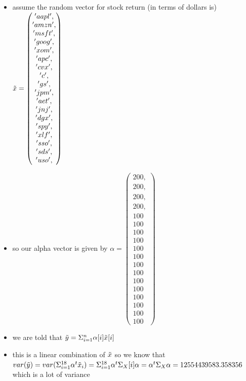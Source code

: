 \documentclass[12pt,twoside]{article}
\begin{document}
\begin{enumerate}
\begin{enumerate}
  \begin{itemize}
    \color{blue}
    \item assume the random vector for stock return (in terms of dollars is) $\Tilde{x}=\begin{pmatrix}
      'aapl',\\
      'amzn',\\
      'msft',\\
      'goog',\\
      'xom', \\
      'apc',  \\
      'cvx', \\
      'c',    \\
      'gs',  \\
      'jpm', \\
      'aet', \\
      'jnj',  \\
      'dgx',\\
      'spy',  \\
      'xlf',\\
      'sso',  \\
      'sds',  \\
      'uso', \\
    \end{pmatrix}$ 
    \item so our alpha vector is given by $\alpha=\begin{pmatrix}
      200,\\
      200,\\
      200,\\
      200,\\
      100\\100\\100\\100\\100\\100\\100\\100\\100\\100\\100\\100\\100\\100
    \end{pmatrix}$
    \item we are told that $\Tilde{y}=\Sigma_{i=1}^{n}\alpha[i]\Tilde{x}[i]$
    \item this is a linear combination of $\Tilde{x}$ so we know that $var(\Tilde{y})=var(\Sigma_{i=1}^{18}\alpha^{t}\Tilde{x}_i)=\Sigma_{i=1}^{18}\alpha^{t}\Sigma_{X}[i]\alpha=\alpha^{t}\Sigma_{X}\alpha=12554439583.358356$  which is a lot of variance 

\end{itemize}
\end{enumerate}
\end{enumerate}
\end{document}
